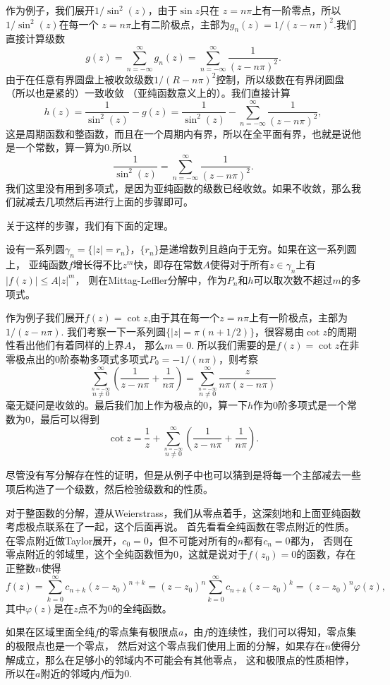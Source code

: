 作为例子，我们展开$1/\sin^2(z)$，由于$\sin z$只在 $z=n\pi$上有一阶零点，所以$1/\sin^2(z)$在每一个 
$z=n\pi$上有二阶极点，主部为$g_n(z)=1/(z-n\pi)^2$.我们直接计算级数
\[
g(z)=\sum_{n=-\infty}^\infty g_n(z)=\sum_{n=-\infty}^\infty \frac{1}{(z-n\pi)^2}.
\]
由于在任意有界圆盘上被收敛级数$1/(R-n\pi)^2$控制，所以级数在有界闭圆盘（所以也是紧的）一致收敛
（亚纯函数意义上的）。我们直接计算
\[
h(z)=\frac{1}{\sin^2(z)}-g(z)=\frac{1}{\sin^2(z)}-\sum_{n=-\infty}^\infty \frac{1}{(z-n\pi)^2},
\]
这是周期函数和整函数，而且在一个周期内有界，所以在全平面有界，也就是说他是一个常数，算一算为0.所以
\[
\frac{1}{\sin^2(z)}=\sum_{n=-\infty}^\infty \frac{1}{(z-n\pi)^2}.
\]
我们这里没有用到多项式，是因为亚纯函数的级数已经收敛。如果不收敛，那么我们就减去几项然后再进行上面的步骤即可。

关于这样的步骤，我们有下面的定理。
\begin{lem}[Cauchy方法]
设有一系列圆$\gamma_n=\{|z|=r_n\}$，$\{r_n\}$是递增数列且趋向于无穷。如果在这一系列圆上，
亚纯函数$f$增长得不比$z^m$快，即存在常数$A$使得对于所有$z\in \gamma_n$上有$|f(z)|\leq A|z|^m$，
则在Mittag-Leffler分解中，作为$P_n$和$h$可以取次数不超过$m$的多项式。
\end{lem}
作为例子我们展开$f(z)=\cot z$,由于其在每一个$z=n \pi$上有一阶极点，主部为$1/(z-n\pi)$.
我们考察一下一系列圆$\{|z|=\pi(n+1/2)\}$，很容易由$\cot z$的周期性看出他们有着同样的上界$A$，
那么$m=0$. 所以我们需要的是$f(z)=\cot z$在非零极点出的0阶泰勒多项式多项式$P_0=-1/(n\pi)$，则考察
\[
\sum_{\stackrel{n=-\infty}{n\neq 0}}^\infty \left(\frac{1}{z-n\pi}+\frac{1}{n\pi}\right)=
\sum_{\stackrel{n=-\infty}{n\neq 0}}^\infty \frac{z}{n\pi(z-n\pi)}
\]
毫无疑问是收敛的。最后我们加上作为极点的0，算一下$h$作为0阶多项式是一个常数为0，最后可以得到
\[
\cot z =\frac{1}{z}+\sum_{\stackrel{n=-\infty}{n\neq 0}}^\infty \left(\frac{1}{z-n\pi}+\frac{1}{n\pi}\right).
\]

尽管没有写分解存在性的证明，但是从例子中也可以猜到是将每一个主部减去一些项后构造了一个级数，然后检验级数和的性质。

对于整函数的分解，遵从Weierstrass，我们从零点着手，这深刻地和上面亚纯函数考虑极点联系在了一起，这个后面再说。
首先看看全纯函数在零点附近的性质。在零点附近做Taylor展开，$c_0=0$，但不可能对所有的$n$都有$c_n=0$都为，
否则在零点附近的邻域里，这个全纯函数恒为0，这就是说对于$f(z_0)=0$的函数，存在正整数$n$使得
\[
    f(z)=\sum_{k=0}^\infty c_{n+k}(z-z_0)^{n+k}=(z-z_0)^n \sum_{k=0}^\infty c_{n+k}(z-z_0)^k=(z-z_0)^n \varphi(z),
\]
其中$\varphi(z)$是在$z$点不为0的全纯函数。

如果在区域里面全纯$f$的零点集有极限点$a$，由$f$的连续性，我们可以得知，零点集的极限点也是一个零点，
然后对这个零点我们使用上面的分解，如果存在$n$使得分解成立，那么在足够小的邻域内不可能会有其他零点，
这和极限点的性质相悖，所以在$a$附近的邻域内$f$恒为0.

